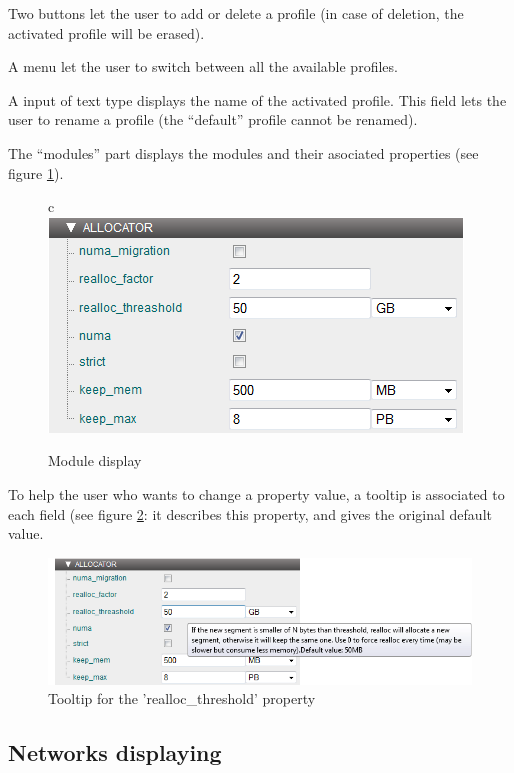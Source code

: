 \documentclass{article}
\begin{document}
\noindent Two buttons let the user to add or delete a profile (in case of deletion, the activated profile will be erased).
\newline

\noindent A menu let the user to switch between all the available profiles.
\newline

\noindent A input of text type displays the name of the activated profile. This field lets the user to rename a profile (the ``default'' profile cannot be renamed).
\newline

\noindent The ``modules'' part displays the modules and their asociated properties (see figure \ref{fig:module_editor}).

\begin{figure}[!h]{c}
\includegraphics{./pictures/module.png}
\caption{Module display}
\label{fig:module_editor}
\end{figure}

\noindent To help the user who wants to change a property value, a tooltip is associated to each field (see figure \ref{fig:title_editor}: it describes this property, and gives the original default value.

\begin{figure}[!h]
\includegraphics[width=\textwidth]{./pictures/title_editor.png}
\caption{Tooltip for the 'realloc\_threshold' property}
\label{fig:title_editor}
\end{figure}

\subsection{Networks displaying}
\end{document}

